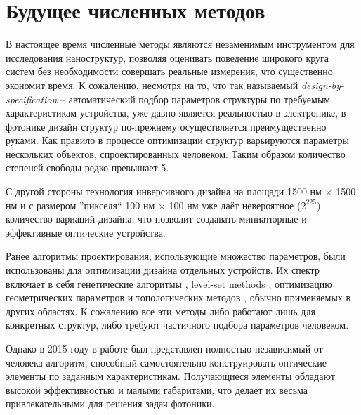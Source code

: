 \section{Будущее численных методов}

В настоящее время численные методы являются незаменимым инструментом для исследования наноструктур, позволяя оценивать поведение широкого круга систем без необходимости совершать реальные измерения, что существенно экономит время. К сожалению, несмотря на то, что  так называемый {\it design-by-specification} -- автоматический подбор параметров структуры по требуемым характеристикам устройства, уже давно является реальностью в электронике, в фотонике дизайн структур по-прежнему осуществляется преимущественно руками. Как правило в процессе оптимизации структур варьируются параметры нескольких объектов, спроектированных человеком. Таким образом количество степеней свободы редко превышает 5.

С другой стороны технология инверсивного дизайна на площади 1500 нм $\times$ 1500 нм и с размером ''пикселя`` 100 нм $\times$ 100 нм уже даёт невероятное ($2^{225}$) количество вариаций дизайна, что позволит создавать миниатюрные и эффективные оптические устройства.

Ранее алгоритмы проектирования, использующие множество параметров, были использованы для оптимизации дизайна отдельных устройств. Их спектр включает в себя генетические алгоритмы \cite{Gondarenko2008}, level-set methods \cite{Kao2005}, оптимизацию геометрических параметров \cite{Seliger2006} и топологических методов \cite{Elesin2012}, обычно применяемых в других областях. К сожалению все эти методы либо работают лишь для конкретных структур, либо требуют частичного подбора параметров человеком. 

Однако в 2015 году в работе \cite{Piggott2015} был представлен полностью независимый от человека алгоритм, способный самостоятельно конструировать оптические элементы по заданным характеристикам. Получающиеся элементы обладают высокой эффективностью и малыми габаритами, что делает их весьма привлекательными для решения задач фотоники.